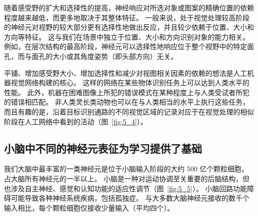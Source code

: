 随着感受野的扩大和选择性的提高，神经响应对所选对象或图案的精确位置的依赖程度越来越低，而更多地取决于其整体特征。
一般来说，处于视觉处理较高阶段的神经元对视野的较大部分更有选择性地做出反应，并且较少依赖于位置、大小和方向等特征。
这与我们在场景中独立于位置、大小和方向识别对象的能力相关。
例如，在层次结构的最高阶段，神经元可以选择性地响应位于整个视野中的特定面孔，而与面孔的大小或其角度姿势（即头部方向）无关。


平铺、增加感受野大小、增加选择性和减少对视图相关因素的依赖的想法是人工机器视觉网络构建的核心。
这样的网络在某些物体识别任务上可以达到人类水平的性能。
此外，机器在困难图像上所犯的错误模式在某种程度上与人类受试者所犯的错误相匹配。
非人类灵长类动物也可以在与人类相当的水平上执行这些任务，而且有趣的是，沿着目标识别通路的不同视觉区域的记录对应于在视觉处理的相似阶段在人工网络中看到的活动（图~\ref{fig:5_4}）。



\subsection{小脑中不同的神经元表征为学习提供了基础}

我们大脑中最丰富的一类神经元是位于小脑输入阶段的大约 500 亿个颗粒细胞，占大脑所有神经元的一半以上。 
小脑是一种对运动协调至关重要的后脑结构，但也涉及自主神经、感觉和认知功能的适应性调节（图~\ref{fig:5_5}）。
小脑回路功能障碍可能导致各种神经系统疾病，包括孤独症。
与大多数大脑神经元接收的数千个输入相比，每个颗粒细胞仅接收少量输入（平均四个）。


